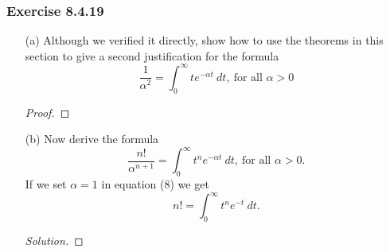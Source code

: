 \subsubsection{Exercise 8.4.19} 
\begin{enumerate}
    \item[(a)] Although we verified it directly, show how to use the theorems in this section to give a second justification for the formula
        \[ \frac{ 1 }{ \alpha^{2}  } = \int_{ 0 }^{ \infty  }  t e^{- \alpha t } \  dt, \ \text{for all } \alpha > 0   \]
        \begin{proof}
        
        \end{proof}
    \item[(b)] Now derive the formula 
        \[  \frac{ n!  }{ \alpha^{n+1} } = \int_{ 0 }^{ \infty  }  t^{n} e^{- \alpha t } \ dt, \ \text{for all } \alpha > 0.\]
        If we set \( \alpha = 1  \) in equation (8) we get 
        \[  n! = \int_{ 0 }^{ \infty  }  t^{n} e^{-t} \ dt. \]
        \begin{proof}[Solution]
        
        \end{proof}
\end{enumerate}











